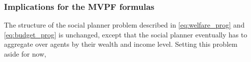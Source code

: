 \documentclass[12pt]{article}
\begin{document}
\subsubsection{Implications for the MVPF formulas}

The structure of the social planner problem described in \eqref{eq:welfare_prog} and \eqref{eq:budget_prog} is unchanged, except that the social planner eventually has to aggregate over agents by their wealth and income level. Setting this problem aside for now,  




\end{document}
